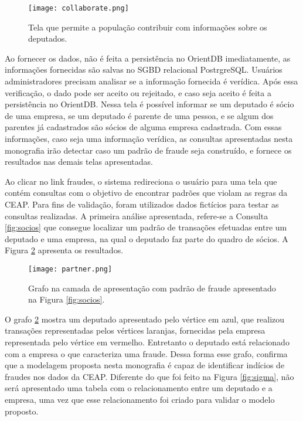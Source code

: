 \begin{figure}[H]
\centering
\texttt{[image: collaborate.png]}
\caption{Tela que permite a população contribuir com informações sobre os deputados.}
\label{fig:collaborate}
\end{figure}

Ao fornecer os dados, não é feita a persistência no OrientDB imediatamente, as informações fornecidas são salvas no SGBD relacional PostrgreSQL. Usuários administradores precisam analisar se a informação fornecida é verídica. Após essa verificação, o dado pode ser aceito ou rejeitado, e caso seja aceito é feita a persistência no OrientDB. Nessa tela é possível informar se um deputado é sócio de uma empresa, se um deputado é parente de uma pessoa, e se algum dos parentes já cadastrados são sócios de alguma empresa cadastrada. Com essas informações, caso seja uma informação verídica, as consultas apresentadas nesta monografia irão detectar caso um padrão de fraude seja construído, e fornece os resultados nas demais telas apresentadas.

Ao clicar no link fraudes, o sistema redireciona o usuário para uma tela que contém consultas com o objetivo de encontrar padrões que violam as regras da CEAP. Para fins de validação, foram utilizados dados fictícios para testar as consultas realizadas. A primeira análise apresentada, refere-se a Consulta \ref{fig:socios} que consegue localizar um padrão de transações efetuadas entre um deputado e uma empresa, na qual o deputado faz parte do quadro de sócios. A Figura \ref{fig:partner} apresenta os resultados.

\begin{figure}[H]
\centering
\texttt{[image: partner.png]}
\caption{Grafo na camada de apresentação com padrão de fraude apresentado na Figura \ref{fig:socios}.}
\label{fig:partner}
\end{figure}

O grafo \ref{fig:partner} mostra um deputado apresentado pelo vértice em azul, que realizou transações representadas pelos vértices laranjas, fornecidas pela empresa representada pelo vértice em vermelho. Entretanto o deputado está relacionado com a empresa o que caracteriza uma fraude. Dessa forma esse grafo, confirma que a modelagem proposta nesta monografia é capaz de identificar indícios de fraudes nos dados da CEAP. Diferente do que foi feito na Figura \ref{fig:sigma}, não será apresentado uma tabela com o relacionamento entre um deputado e a empresa, uma vez que esse relacionamento foi criado para validar o modelo proposto.

